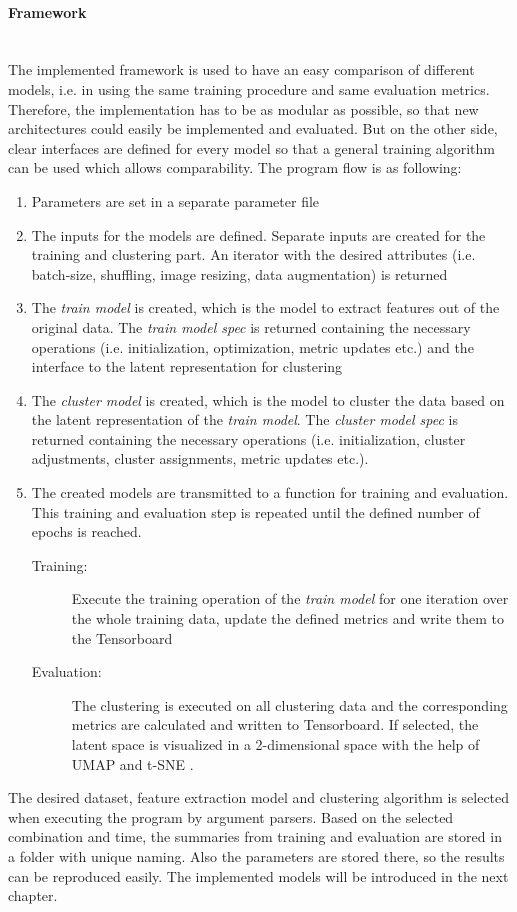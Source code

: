 \documentclass[12pt,DIV14,BCOR12mm,a4paper,footexclude,headinclude,halfparskip-,twoside,openright,cleardoubleempty,idxtotoc,bibtotoc,listtotoc,abstracton]{scrreprt} %
\numberwithin{equation}{chapter}
\begin{document}
\paragraph{Framework}\mbox{}\\
The implemented framework is used to have an easy comparison of different models, i.e. in using the same training procedure and same evaluation metrics. Therefore, the implementation has to be as modular as possible, so that new architectures could easily be implemented and evaluated. But on the other side, clear interfaces are defined for every model so that a general training algorithm can be used which allows comparability. The program flow is as following:
\begin{enumerate}
	\item Parameters are set in a separate parameter file
	\item The inputs for the models are defined. Separate inputs are created for the training and clustering part. An iterator with the desired attributes (i.e. batch-size, shuffling, image resizing, data augmentation) is returned 
	\item The \textit{train model} is created, which is the model to extract features out of the original data. The \textit{train model spec} is returned containing the necessary operations (i.e. initialization, optimization, metric updates etc.) and the interface to the latent representation for clustering
	\item The \textit{cluster model} is created, which is the model to cluster the data based on the latent representation of the \textit{train model}. The \textit{cluster model spec} is returned containing the necessary operations (i.e. initialization, cluster adjustments, cluster assignments, metric updates etc.).
	\item The created models are transmitted to a function for training and evaluation. This training and evaluation step is repeated until the defined number of epochs is reached.
		\begin{description}
			\item[Training:] Execute the training operation of the \textit{train model} for one iteration over the whole training data, update the defined metrics and write them to the Tensorboard
			\item[Evaluation:] The clustering is executed on all clustering data and the corresponding metrics are calculated and written to Tensorboard. If selected, the latent space is visualized in a 2-dimensional space with the help of UMAP \cite{mcinnes2018umap-software} and t-SNE \cite{t-SNE}.			
		\end{description}
\end{enumerate}
The desired dataset, feature extraction model and clustering algorithm is selected when executing the program by argument parsers. Based on the selected combination and time, the summaries from training and evaluation are stored in a folder with unique naming. Also the parameters are stored there, so the results can be reproduced easily. The implemented models will be introduced in the next chapter.
\end{document}
